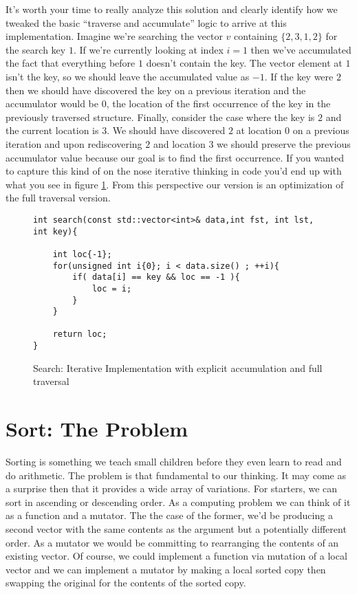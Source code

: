 \documentclass[]{tufte-handout}
\begin{document}
It's worth your time to really analyze this solution and clearly identify how we tweaked the basic ``traverse and accumulate'' logic to arrive at this implementation. Imagine we're searching the vector $v$ containing $\{2,3,1,2\}$ for the search key $1$. If we're currently looking at index $i=1$ then we've accumulated the fact that everything before $1$ doesn't contain the key. The vector element at $1$ isn't the key, so we should leave the accumulated value as $-1$. If the key were $2$ then we should have discovered the key on a previous iteration and the accumulator would be $0$, the location of the first occurrence of the key in the previously traversed structure. Finally, consider the case where the key is $2$ and the current location is $3$. We should have discovered $2$ at location $0$ on a previous iteration and upon rediscovering $2$ and location $3$ we should preserve the previous accumulator value because our goal is to find the first occurrence. If you wanted to capture this kind of on the nose iterative thinking in code you'd end up with what you see in figure \ref{code:searchiter2}. From this perspective our version is an optimization of the full traversal version. 

\begin{figure}[htpb!]
\begin{lstlisting}
int search(const std::vector<int>& data,int fst, int lst, int key){

	int loc{-1};
    for(unsigned int i{0}; i < data.size() ; ++i){
    	if( data[i] == key && loc == -1 ){
			loc = i;
		}
    }

    return loc;
}
\end{lstlisting}
\label{code:searchiter2}
\caption{Search: Iterative Implementation with explicit accumulation and full traversal}
\end{figure}

\section{Sort: The Problem}

Sorting is something we teach small children before they even learn to read and do arithmetic. The problem is that fundamental to our thinking. It may come as a surprise then that it provides a wide array of variations.  For starters, we can sort in ascending or descending order. As a computing problem we can think of it as a function and a mutator. The the case of the former, we'd be producing a second vector with the same contents as the argument but a potentially different order. As a mutator we would be committing to rearranging the contents of an existing vector. Of course, we could implement a function via mutation of a local vector and we can implement a mutator by making a local sorted copy then swapping the original for the contents of the sorted copy. 
\end{document}
